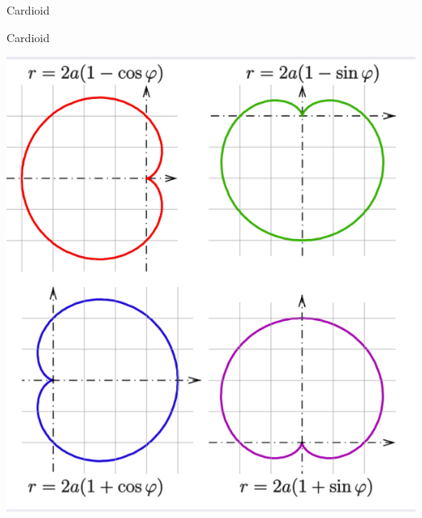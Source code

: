 \documentclass{beamer}
\begin{document}
\begin{frame}{Cardioid}
    \begin{block}{Cardioid}
        \begin{center}
    \includegraphics[width=0.5\linewidth]{Cardioid.png}
\end{center}
    \end{block}
\end{frame}
\end{document}
